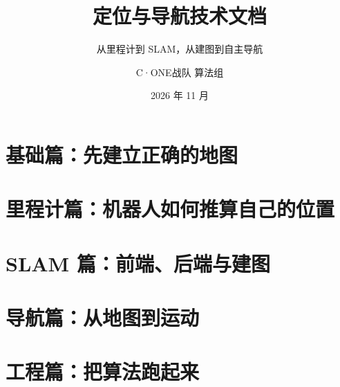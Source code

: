 \documentclass[lang=cn,newtx,10pt,scheme=chinese,color=blue]{elegantbook}
\title{定位与导航技术文档}
\subtitle{从里程计到 SLAM，从建图到自主导航}
\author{C·ONE战队 算法组}
\institute{RoboMaster C·ONE战队 算法组}
\date{2026 年 11 月}
\begin{document}
\maketitle


\frontmatter

\tableofcontents

\mainmatter

\part{基础篇：先建立正确的地图}





\part{里程计篇：机器人如何推算自己的位置}









\part{SLAM 篇：前端、后端与建图}









\part{导航篇：从地图到运动}









\part{工程篇：把算法跑起来}








\printbibliography[heading=bibintoc, title=\ebibname]

\appendix


\end{document}
